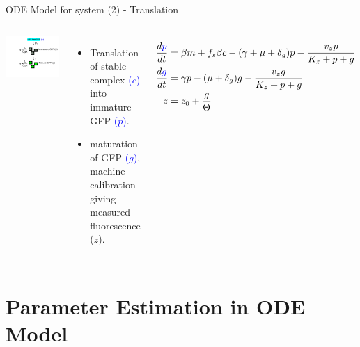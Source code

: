\documentclass{beamer}
\begin{document}
\begin{frame}{ODE Model for system (2) - Translation}{}
\begin{columns}
\includegraphics[trim = 0 0 0 0,clip = true,scale = 0.31]{Figures/schematic_translation}
  \begin{itemize}
    \item Translation of stable complex \textcolor{blue}{($c$)} into immature GFP \textcolor{blue}{($p$)}. 
    \item maturation of GFP \textcolor{blue}{($g$)}, machine calibration giving measured fluorescence ($z$).
    \end{itemize}
\footnotesize
\begin{align*} 
\frac{d\textcolor{blue}{p}}{dt} & = \beta m +f_{s}\beta c -(\gamma + \mu + \delta_{g})p - \frac{v_{z}p}{K_{z}+p+g}   \\
\frac{d\textcolor{blue}{g}}{dt} & = \gamma p - (\mu + \delta_{g})g - \frac{v_{z}g}{K_{z}+p+g} \\
z &= z_{0} +\frac{g}{\Theta} 
\end{align*}
\end{columns}
\end{frame}

\section{Parameter Estimation in ODE Model}
\end{document}
